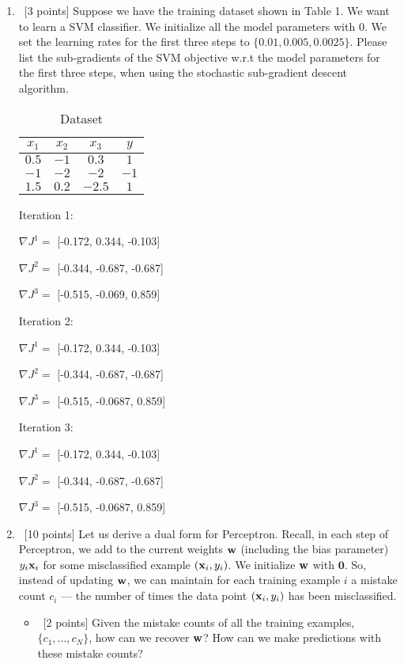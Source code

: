 \documentclass[12pt, fullpage,letterpaper]{article}
\begin{document}
\begin{enumerate}
	\item~[3 points] Suppose we have the training dataset shown in Table 1. We want to learn a SVM classifier. We initialize all the model parameters with $0$. We set the learning rates for the first three steps to $\{0.01, 0.005, 0.0025\}$.  Please list the sub-gradients of the SVM objective w.r.t the model parameters for the first three steps, when using the stochastic sub-gradient descent algorithm. 
	\begin{table}[h]
		\centering
		\begin{tabular}{ccc|c}
			$x_1$ & $x_2$ & $x_3$ &  $y$\\ 
			\hline\hline
			$0.5$ & $-1$ & $0.3$ & $1$ \\ \hline
			$-1$ & $-2$ & $-2$ & $-1$\\ \hline
			$1.5$ & $0.2$ & $-2.5$ & $1$\\ \hline
		\end{tabular}
	\caption{Dataset}
	\end{table}

	Iteration 1:
	
	$\nabla J^1 = $ [-0.172, 0.344, -0.103]
	
	$\nabla J^2 = $ [-0.344, -0.687, -0.687]
	
	$\nabla J^3 = $ [-0.515, -0.069, 0.859]
	
	Iteration 2:
	
	$\nabla J^1 = $ [-0.172, 0.344, -0.103]
	
	$\nabla J^2 = $ [-0.344, -0.687, -0.687]
	
	$\nabla J^3 = $ [-0.515, -0.0687, 0.859]
	
	Iteration 3:
	
	$\nabla J^1 = $ [-0.172, 0.344, -0.103]
	
	$\nabla J^2 = $ [-0.344, -0.687, -0.687]
	
	$\nabla J^3 = $ [-0.515, -0.0687, 0.859]

	\item~[10 points] Let us derive a dual form for Perceptron. Recall, in each step of Perceptron, we add to the current weights ${\bf w}$ (including the bias parameter) $y_i{\bf x}_i$ for some misclassified example $({\bf x}_i, y_i)$. We initialize ${\bf w}$ with $\mathbf{0}$. So, instead of updating ${\bf w}$, we can maintain for each training example $i$ a mistake count $c_i$ --- the number of times the data point $({\bf x}_i, y_i)$ has been misclassified. 
	
	\begin{itemize}
		\item~[2 points] Given the mistake counts of all the training examples, $\{c_1, \ldots, c_N\}$, how can we recover ${\bf w}$? How can we make predictions with these mistake counts? 
		

\end{itemize}
\end{enumerate}
\end{document}

